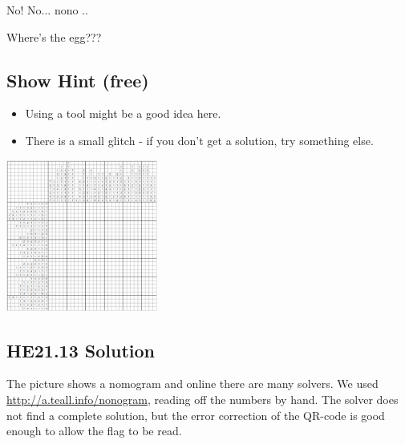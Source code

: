 \documentclass[english,a4paper,nols,noindent]{tufte-handout}
\begin{document}
\noindent No! No... nono ..

Where's the egg???

\subsection{Show Hint (free)}
\begin{itemize}
\item Using a tool might be a good idea here.
\item There is a small glitch - if you don't get a solution, try something else.
\end{itemize}

\begin{marginfigure}
    \includegraphics[width=50mm]{ch13/nonobunnygram.png}
\end{marginfigure}


\hypertarget{he21.13-solution}{%
\subsection{HE21.13 Solution}\label{he21.13-solution}}

\noindent The picture shows a nomogram and online there are many
solvers.  We used \url{http://a.teall.info/nonogram}, reading off the
numbers by hand.  The solver does not find a complete solution, but
the error correction of the QR-code is good enough to allow the flag
to be read.
\end{document}
